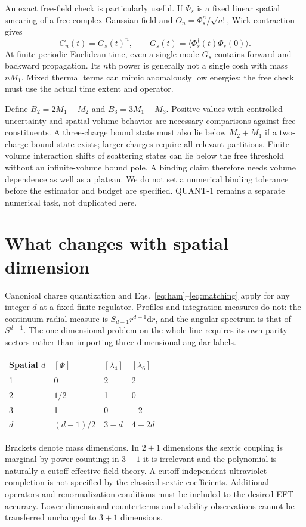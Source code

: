 \documentclass[11pt,a4paper]{article}
\newcommand{\dd}{\mathrm d}
\begin{document}
An exact free-field check is particularly useful. If $\Phi_s$ is a fixed
linear spatial smearing of a free complex Gaussian field and
$O_n=\Phi_s^n/\sqrt{n!}$, Wick contraction gives
\begin{equation}\label{eq:wick}
 C_n(t)=G_s(t)^n,\qquad
 G_s(t)=\langle\Phi_s^\dagger(t)\Phi_s(0)\rangle.
\end{equation}
At finite periodic Euclidean time, even a single-mode $G_s$ contains forward
and backward propagation. Its $n$th power is generally not a single cosh
with mass $nM_1$. Mixed thermal terms can mimic anomalously low energies;
the free check must use the actual time extent and operator.

Define $B_2=2M_1-M_2$ and $B_3=3M_1-M_3$.
Positive values with controlled uncertainty and spatial-volume behavior are
necessary comparisons against free constituents. A three-charge bound state
must also lie below $M_2+M_1$ if a two-charge bound state exists; larger charges
require all relevant partitions. Finite-volume interaction shifts of scattering
states can lie below the free threshold without an infinite-volume bound pole.
A binding claim therefore needs volume dependence as well as a plateau.
We do not set a numerical binding tolerance before the estimator and budget
are specified. QUANT-1 remains a separate numerical task, not duplicated here.

\section{What changes with spatial dimension}
Canonical charge quantization and Eqs.~\eqref{eq:ham}--\eqref{eq:matching}
apply for any integer $d$ at a fixed finite regulator. Profiles and integration
measures do not: the continuum radial measure is
$S_{d-1}r^{d-1}\dd r$, and the angular spectrum is that of $S^{d-1}$.
The one-dimensional problem on the whole line requires its own parity
sectors rather than importing three-dimensional angular labels.

\begin{center}
\begin{tabular}{@{}llll@{}}
\toprule
Spatial $d$ & $[\Phi]$ & $[\lambda_4]$ & $[\lambda_6]$\\
\midrule
1 & 0 & 2 & 2\\
2 & $1/2$ & 1 & 0\\
3 & 1 & 0 & $-2$\\
$d$ & $(d-1)/2$ & $3-d$ & $4-2d$\\
\bottomrule
\end{tabular}
\end{center}
Brackets denote mass dimensions. In $2+1$ dimensions the sextic coupling is
marginal by power counting; in $3+1$ it is irrelevant and the polynomial is
naturally a cutoff effective field theory. A cutoff-independent ultraviolet
completion is not specified by the classical sextic coefficients. Additional
operators and renormalization conditions must be included to the desired EFT
accuracy. Lower-dimensional counterterms and stability observations cannot be
transferred unchanged to $3+1$ dimensions.
\end{document}
